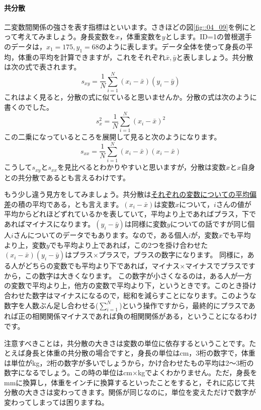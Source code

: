 \documentclass{ltjbook}
\begin{document}
\paragraph{共分散}二変数間関係の強さを表す指標はといいます。さきほどの図\ref{fig::04_09}を例にとって考えてみましょう。身長変数を$x$，体重変数を$y$とします。ID=1の曽根選手のデータは，$x_1= 175,y_1=68$のように表します。データ全体を使って身長の平均，体重の平均を計算できますが，これをそれぞれ$\bar{x},\bar{y}$と表しましょう。共分散は次の式で表されます。
\[ s_{xy} = \frac{1}{N}\sum_{i=1}^N (x_i - \bar{x})(y_i - \bar{y}) \label{ref:covariance}\]
これはよく見ると，分散の式に似ていると思いませんか。分散の式は次のように書くのでした。
\[ s_{x}^2 = \frac{1}{N}\sum_{i=1}^N (x_i - \bar{x})^2 \]
この二乗になっているところを展開して見ると次のようになります。
\[ s_{xx} = \frac{1}{N}\sum_{i=1}^N (x_i - \bar{x})(x_i - \bar{x}) \]
こうして$s_{xy}$と$s_{xx}$を見比べるとわかりやすいと思いますが，分散は変数$x$と$x$自身との共分散であるとも言えるわけです。

もう少し違う見方をしてみましょう。共分散は\uline{それぞれの変数についての平均偏差}の積の平均である，とも言えます。$(x_i - \bar{x})$は変数$x$について，$i$さんの値が平均からどれほどずれているかを表していて，平均より上であればプラス，下であればマイナスになります。$(y_i - \bar{y})$は同様に変数$y$についての話ですが同じ個人$i$さんについてのデータでもあります。なので，ある個人$i$が，変数$x$でも平均より上，変数$y$でも平均より上であれば，この2つを掛け合わせた$(x_i - \bar{x})(y_i - \bar{y})$はプラス$\times$プラスで，プラスの数字になります。
同様に，ある人がどちらの変数でも平均より下であれば，マイナス$\times$マイナスでプラスですから，この数字は大きくなります。
この数字が小さくなるのは，ある人が一方の変数で平均より上，他方の変数で平均より下，というときです。このとき掛け合わせた数字はマイナスになるので，総和を減らすことになります。このような数字を人数ぶん足し合わせる($\sum_{i=1}^N$)という操作ですから，最終的にプラスであれば正の相関関係マイナスであれば負の相関関係がある，ということになるわけです。

注意すべきことは，共分散の大きさは変数の単位に依存するということです。たとえば身長と体重の共分散の場合ですと，身長の単位はcm，3桁の数字で，体重は単位がkg，2桁の数字が多いでしょうから，かけ合わせたもの平均は2〜3桁の数字になるでしょう。この時の単位はcm$\times$kgでよくわかりません。ただ，身長をmmに換算し，体重をインチに換算するといったことをすると，それに応じて共分散の大きさは変わってきます。関係が同じなのに，単位を変えただけで数字が変わってしまっては困りますね。
\end{document}
